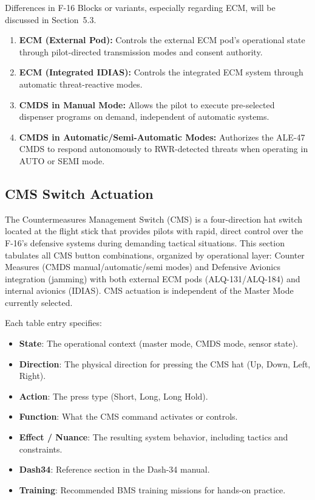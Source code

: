 \documentclass[11pt,a4paper]{article}
\begin{document}
Differences in F-16 Blocks or variants, especially regarding ECM, will be discussed in Section~5.3.

\begin{enumerate}
  \item \textbf{ECM (External Pod):} Controls the external ECM pod's operational state through pilot-directed transmission modes and consent authority.
  \item \textbf{ECM (Integrated IDIAS):} Controls the integrated ECM system through automatic threat-reactive modes.
  \item \textbf{CMDS in Manual Mode:} Allows the pilot to execute pre-selected dispenser programs on demand, independent of automatic systems.
  \item \textbf{CMDS in Automatic/Semi-Automatic Modes:} Authorizes the ALE-47 CMDS to respond autonomously to RWR-detected threats when operating in AUTO or SEMI mode.
\end{enumerate}

\subsection{CMS Switch Actuation}
\label{sec:C5-S2-cms-actuation}

The Countermeasures Management Switch (CMS) is a four-direction hat switch located at the flight stick that provides pilots with rapid, direct control over the F-16's defensive systems during demanding tactical situations. This section tabulates all CMS button combinations, organized by operational layer: Counter Measures (CMDS manual/automatic/semi modes) and Defensive Avionics integration (jamming) with both external ECM pods (ALQ-131/ALQ-184) and internal avionics (IDIAS). CMS actuation is independent of the Master Mode currently selected.

Each table entry specifies:

\begin{itemize}
  \item \textbf{State}: The operational context (master mode, CMDS mode, sensor state).
  \item \textbf{Direction}: The physical direction for pressing the CMS hat (Up, Down, Left, Right).
  \item \textbf{Action}: The press type (Short, Long, Long Hold).
  \item \textbf{Function}: What the CMS command activates or controls.
  \item \textbf{Effect / Nuance}: The resulting system behavior, including tactics and constraints.
  \item \textbf{Dash34}: Reference section in the Dash-34 manual.
  \item \textbf{Training}: Recommended BMS training missions for hands-on practice.
\end{itemize}
\end{document}
